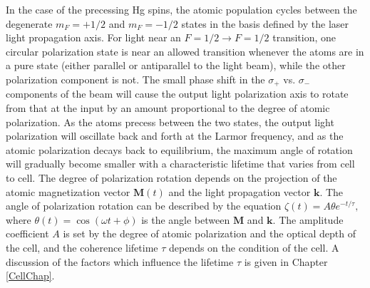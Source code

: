 \documentclass [10pt, twoside] {uwthesis}[2012/04/02]
\begin{document}
In the case of the precessing Hg spins, the atomic population cycles between the degenerate $m_F=+1/2$ and $m_F=-1/2$ states in the basis defined by the laser light propagation axis. For light near an $F = 1/2 \rightarrow F = 1/2$ transition, one circular polarization state is near an allowed transition whenever the atoms are in a pure state (either parallel or antiparallel to the light beam), while the other polarization component is not. The small phase shift in the $\sigma_+$ vs. $\sigma_-$ components of the beam will cause the output light polarization axis to rotate from that at the input by an amount proportional to the degree of atomic polarization. As the atoms precess between the two states, the output light polarization will oscillate back and forth at the Larmor frequency, and as the atomic polarization decays back to equilibrium, the maximum angle of rotation will gradually become smaller with a characteristic lifetime that varies from cell to cell. The degree of polarization rotation depends on the projection of the atomic magnetization vector $\mathbf{M}(t)$ and the light propagation vector $\mathbf{k}$. The angle of polarization rotation can be described by the equation $\zeta(t) = A\theta e^{-t/\tau},$ where $\theta(t) = \cos(\omega t + \phi)$ is the angle between $\mathbf{M}$ and $\mathbf{k}.$ The amplitude coefficient $A$ is set by the degree of atomic polarization and the optical depth of the cell, and the coherence lifetime $\tau$ depends on the condition of the cell. A discussion of the factors which influence the lifetime $\tau$ is given in Chapter \ref{CellChap}.
\end{document}
